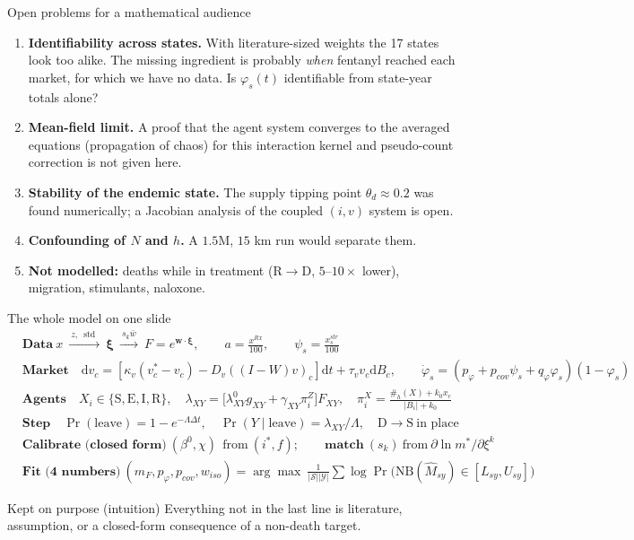 ﻿\documentclass[9pt,aspectratio=169]{beamer}
\newenvironment{kept}{\begin{exampleblock}{Kept on purpose (intuition)}\small}{\end{exampleblock}}
\newcommand{\Sc}{\mathrm{S}}\newcommand{\Ec}{\mathrm{E}}\newcommand{\Ic}{\mathrm{I}}\newcommand{\Rc}{\mathrm{R}}\newcommand{\Dc}{\mathrm{D}}
\newcommand{\dd}{\mathrm d}
\begin{document}
\begin{frame}{Open problems for a mathematical audience}
 \begin{enumerate}\setlength\itemsep{4pt}
  \item \textbf{Identifiability across states.} With literature-sized weights the 17 states look too alike. The missing ingredient is probably \emph{when} fentanyl reached each market, for which we have no data. Is $\varphi_s(t)$ identifiable from state-year totals alone?
  \item \textbf{Mean-field limit.} A proof that the agent system converges to the averaged equations (propagation of chaos) for this interaction kernel and pseudo-count correction is not given here.
  \item \textbf{Stability of the endemic state.} The supply tipping point $\theta_d\approx0.2$ was found numerically; a Jacobian analysis of the coupled $(i,v)$ system is open.
  \item \textbf{Confounding of $N$ and $h$.} A $1.5$M, $15$ km run would separate them.
  \item \textbf{Not modelled:} deaths while in treatment ($\Rc\to\Dc$, $5$--$10\times$ lower), migration, stimulants, naloxone.
 \end{enumerate}
\end{frame}

\begin{frame}{The whole model on one slide}
 \small
 \begin{align*}
  &\textbf{Data}\ x\ \xrightarrow{\ z,\ \operatorname{std}\ }\ \bm\xi\ \xrightarrow{\ s_k\bar w\ }\ F=e^{\bm w\cdot\bm\xi},\qquad a=\tfrac{x^{Rx}}{100},\qquad \psi_s=\tfrac{x^{str}_s}{100}\\
  &\textbf{Market}\quad \dd v_c=[\kappa_v(v^\ast_c-v_c)-D_v((I-W)v)_c]\dd t+\tau_vv_c\dd B_c,\qquad
   \dot\varphi_s=(p_\varphi+p_{cov}\psi_s+q_\varphi\varphi_s)(1-\varphi_s)\\
  &\textbf{Agents}\quad X_i\in\{\Sc,\Ec,\Ic,\Rc\},\quad \lambda_{XY}=\big[\lambda^0_{XY}g_{XY}+\gamma_{XY}\pi^Z_i\big]F_{XY},\quad \pi^X_i=\tfrac{\#_h(X)+k_0x_c}{|B_i|+k_0}\\
  &\textbf{Step}\quad \Pr(\text{leave})=1-e^{-\Lambda\Delta t},\quad \Pr(Y\mid\text{leave})=\lambda_{XY}/\Lambda,\quad \Dc\to\Sc\ \text{in place}\\
  &\textbf{Calibrate (closed form)}\ (\beta^0,\chi)\ \ \text{from}\ (i^\ast,f);\qquad \textbf{match}\ (s_k)\ \text{from}\ \partial\ln m^\ast/\partial\xi^k\\
  &\textbf{Fit (4 numbers)}\ (m_F,p_\varphi,p_{cov},w_{iso})=\arg\max\ \tfrac1{|\mathcal S||\mathcal Y|}\sum\log\Pr\big(\mathrm{NB}(\widehat M_{sy})\in[L_{sy},U_{sy}]\big)
 \end{align*}
 \begin{kept}
  Everything not in the last line is literature, assumption, or a closed-form consequence of a non-death target.
 \end{kept}
\end{frame}
\end{document}
